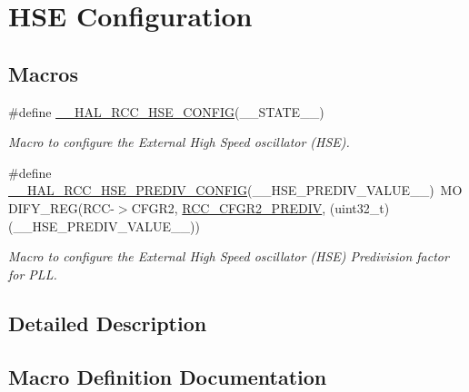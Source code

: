 \hypertarget{group___r_c_c___h_s_e___configuration}{}\section{H\+SE Configuration}
\label{group___r_c_c___h_s_e___configuration}
\subsection*{Macros}
\begin{DoxyCompactItemize}
\item 
\#define \hyperlink{group___r_c_c___h_s_e___configuration_gaa3d98648399f15d02645ef84f6ca8e4b}{\+\_\+\+\_\+\+H\+A\+L\+\_\+\+R\+C\+C\+\_\+\+H\+S\+E\+\_\+\+C\+O\+N\+F\+IG}(\+\_\+\+\_\+\+S\+T\+A\+T\+E\+\_\+\+\_\+)
\begin{DoxyCompactList}\small\item\em Macro to configure the External High Speed oscillator (H\+SE). \end{DoxyCompactList}\item 
\#define \hyperlink{group___r_c_c___h_s_e___configuration_gafc6bfe4fd172ea49871172fa137b60e0}{\+\_\+\+\_\+\+H\+A\+L\+\_\+\+R\+C\+C\+\_\+\+H\+S\+E\+\_\+\+P\+R\+E\+D\+I\+V\+\_\+\+C\+O\+N\+F\+IG}(\+\_\+\+\_\+\+H\+S\+E\+\_\+\+P\+R\+E\+D\+I\+V\+\_\+\+V\+A\+L\+U\+E\+\_\+\+\_\+)~M\+O\+D\+I\+F\+Y\+\_\+\+R\+EG(R\+CC-\/$>$C\+F\+G\+R2, \hyperlink{group___peripheral___registers___bits___definition_ga022892b6d0e4ee671b82e7f6552b0074}{R\+C\+C\+\_\+\+C\+F\+G\+R2\+\_\+\+P\+R\+E\+D\+IV}, (uint32\+\_\+t)(\+\_\+\+\_\+\+H\+S\+E\+\_\+\+P\+R\+E\+D\+I\+V\+\_\+\+V\+A\+L\+U\+E\+\_\+\+\_\+))
\begin{DoxyCompactList}\small\item\em Macro to configure the External High Speed oscillator (H\+SE) Predivision factor for P\+LL. \end{DoxyCompactList}\end{DoxyCompactItemize}


\subsection{Detailed Description}


\subsection{Macro Definition Documentation}
\mbox{\label{group___r_c_c___h_s_e___configuration_gaa3d98648399f15d02645ef84f6ca8e4b}} 
